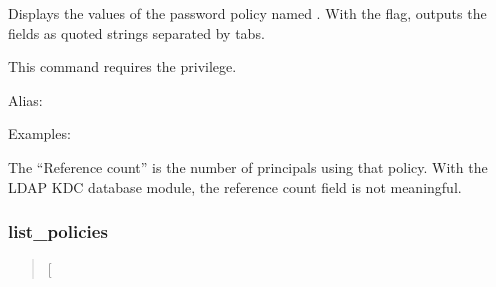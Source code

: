 \documentclass[letterpaper,10pt,english]{sphinxmanual}
\begin{document}
\sphinxAtStartPar
Displays the values of the password policy named .  With the
 flag, outputs the fields as quoted strings separated by
tabs.

\sphinxAtStartPar
This command requires the  privilege.

\sphinxAtStartPar
Alias: 

\sphinxAtStartPar
Examples:

\begin{sphinxVerbatim}[commandchars=\\\{\}]
  
 
     
   
   
      
     
  

   
                       
\end{sphinxVerbatim}

\sphinxAtStartPar
The “Reference count” is the number of principals using that policy.
With the LDAP KDC database module, the reference count field is not
meaningful.


\subsubsection{list\_policies}
\label{\detokenize{admin/admin_commands/kadmin_local:list-policies}}\label{\detokenize{admin/admin_commands/kadmin_local:id16}}\begin{quote}

\sphinxAtStartPar
{} {[}\sphinxstyleemphasis{expression}{]}
\end{quote}
\end{document}
